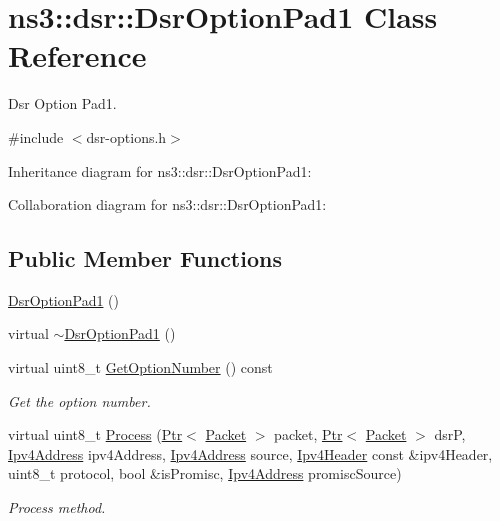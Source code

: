 \hypertarget{classns3_1_1dsr_1_1DsrOptionPad1}{}\section{ns3\+:\+:dsr\+:\+:Dsr\+Option\+Pad1 Class Reference}
\label{classns3_1_1dsr_1_1DsrOptionPad1}


Dsr Option Pad1.  




{\ttfamily \#include $<$dsr-\/options.\+h$>$}



Inheritance diagram for ns3\+:\+:dsr\+:\+:Dsr\+Option\+Pad1\+:


Collaboration diagram for ns3\+:\+:dsr\+:\+:Dsr\+Option\+Pad1\+:
\subsection*{Public Member Functions}
\begin{DoxyCompactItemize}
\item 
\hyperlink{classns3_1_1dsr_1_1DsrOptionPad1_a957deab5896314143b7c5ce2bfc541a7}{Dsr\+Option\+Pad1} ()
\item 
virtual \hyperlink{classns3_1_1dsr_1_1DsrOptionPad1_a53df3ae2da993cc91eb0c249745fd993}{$\sim$\+Dsr\+Option\+Pad1} ()
\item 
virtual uint8\+\_\+t \hyperlink{classns3_1_1dsr_1_1DsrOptionPad1_a4844affa29dc4a642705639a35dfce99}{Get\+Option\+Number} () const 
\begin{DoxyCompactList}\small\item\em Get the option number. \end{DoxyCompactList}\item 
virtual uint8\+\_\+t \hyperlink{classns3_1_1dsr_1_1DsrOptionPad1_a4a8fd7d5c19337b08678e1149dc7e7a5}{Process} (\hyperlink{classns3_1_1Ptr}{Ptr}$<$ \hyperlink{classns3_1_1Packet}{Packet} $>$ packet, \hyperlink{classns3_1_1Ptr}{Ptr}$<$ \hyperlink{classns3_1_1Packet}{Packet} $>$ dsrP, \hyperlink{classns3_1_1Ipv4Address}{Ipv4\+Address} ipv4\+Address, \hyperlink{classns3_1_1Ipv4Address}{Ipv4\+Address} source, \hyperlink{classns3_1_1Ipv4Header}{Ipv4\+Header} const \&ipv4\+Header, uint8\+\_\+t protocol, bool \&is\+Promisc, \hyperlink{classns3_1_1Ipv4Address}{Ipv4\+Address} promisc\+Source)
\begin{DoxyCompactList}\small\item\em Process method. \end{DoxyCompactList}\end{DoxyCompactItemize}
